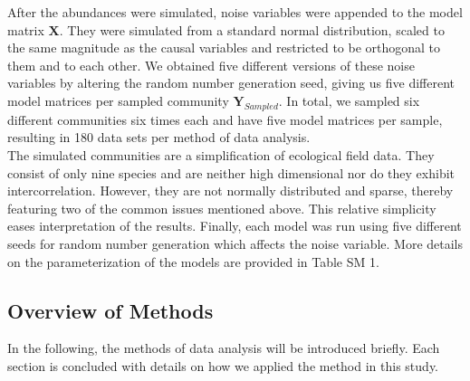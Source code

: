 \documentclass[a4paper,11pt]{article}
\begin{document}
	    
		After the abundances were simulated, noise variables were appended to the model matrix $\mathbf{X}$.
		They were simulated from a standard normal distribution, scaled to the same magnitude as the causal variables and restricted to be orthogonal to them and to each other.  
	    We obtained five different versions of these noise variables by altering the random number generation seed,  giving us five different model matrices per sampled community $\mathbf{Y}_{Sampled}$.  
	    In total, we sampled six different communities six times each and have five model matrices per sample, resulting in 180 data sets per method of data analysis.\\
        The simulated communities are a simplification of ecological field data. 
        They consist of only nine species and are neither high dimensional nor do they exhibit intercorrelation.
        However, they are not normally distributed and sparse, thereby featuring two of the common issues mentioned above. 
        This relative simplicity eases interpretation of the results.
        Finally, each model was run using five different seeds for random number generation which affects the noise variable. 
        More details on the parameterization of the models are provided in Table SM 1.

    
    \subsection*{Overview of Methods}
        
        In the following, the methods of data analysis will be introduced briefly. 
        Each section is concluded with details on how we applied the method in this study.  \\
	
\end{document}
